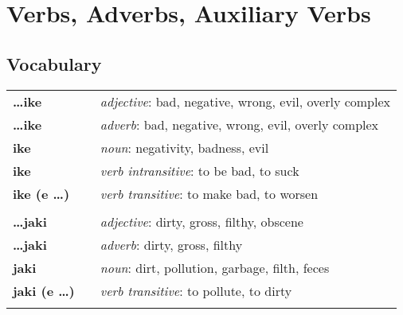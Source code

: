 \section{Verbs, Adverbs, Auxiliary Verbs}
%
\subsection*{Vocabulary}
\begin{supertabular}{p{2,5cm}|ll}
    \textbf{\dots ike}       &  & \textit{adjective}: bad, negative, wrong, evil, overly complex                 \\ %
    \textbf{\dots ike}       &  & \textit{adverb}: bad, negative, wrong, evil, overly complex                    \\ %
    \textbf{ike}             &  & \textit{noun}: negativity, badness, evil                                       \\ %
    \textbf{ike}             &  & \textit{verb intransitive}: to be bad, to suck                                 \\ %
    \textbf{ike (e \dots)}   &  & \textit{verb transitive}: to make bad, to worsen                               \\ %
                             &  &                                                                                \\ %
    \textbf{\dots jaki}      &  & \textit{adjective}: dirty, gross, filthy, obscene                              \\ %
    \textbf{\dots jaki}      &  & \textit{adverb}: dirty, gross, filthy                                          \\ %
    \textbf{jaki}            &  & \textit{noun}: dirt, pollution, garbage, filth, feces                          \\ %
    \textbf{jaki (e \dots)}  &  & \textit{verb transitive}: to pollute, to dirty                                 \\ %
                             &  &                                                                                \\ %

\end{supertabular}
